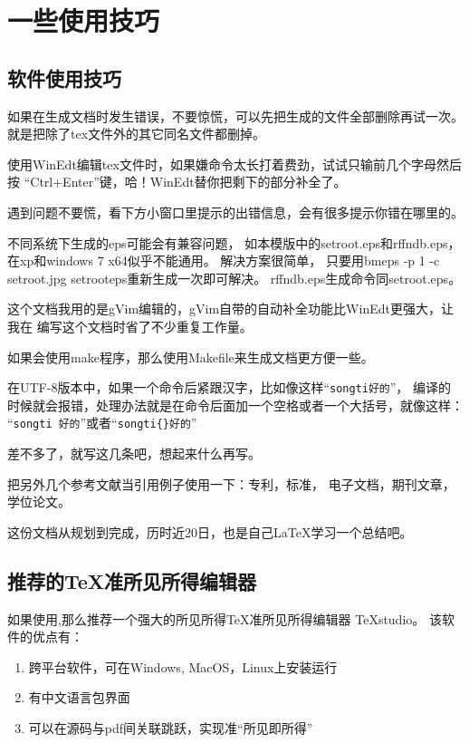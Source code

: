 \chapter{一些使用技巧}



\section{软件使用技巧}

如果在生成文档时发生错误，不要惊慌，可以先把生成的文件全部删除再试一次。
就是把除了tex文件外的其它同名文件都删掉。

使用WinEdt编辑tex文件时，如果嫌命令太长打着费劲，试试只输前几个字母然后按
“Ctrl+Enter”键，哈！WinEdt替你把剩下的部分补全了。

遇到问题不要慌，看下方小窗口里提示的出错信息，会有很多提示你错在哪里的。

不同系统下生成的eps可能会有兼容问题，
如本模版中的setroot.eps和rffndb.eps，在xp和windows 7 x64似乎不能通用。
解决方案很简单，
只要用bmeps -p 1 -c setroot.jpg setrooteps重新生成一次即可解决。
rffndb.eps生成命令同setroot.eps。

这个文档我用的是gVim编辑的，gVim自带的自动补全功能比WinEdt更强大，让我在
编写这个文档时省了不少重复工作量。

如果会使用make程序，那么使用Makefile来生成文档更方便一些。

在UTF-8版本中，如果一个命令后紧跟汉字，比如像这样“\verb+songti好的+”，
编译的时候就会报错，处理办法就是在命令后面加一个空格或者一个大括号，就像这样：
“\verb+songti 好的+”或者“\verb+songti{}好的+”

差不多了，就写这几条吧，想起来什么再写。

把另外几个参考文献当引用例子使用一下：专利\cite{WangZL}，标准\cite{WangStd}，
电子文档\cite{ZLB:1997}，期刊文章\cite{LUOZ:2007}，
学位论文\cite{wang:2008,wangmt:2008}。

这份文档从规划到完成，历时近20日，也是自己\LaTeX 学习一个总结吧。

\section{推荐的\TeX 准所见所得编辑器}

如果使用\XeTeX ,那么推荐一个强大的所见所得\TeX 准所见所得编辑器 TeXstudio。
该软件的优点有：

\begin{enumerate}
	
	\item{跨平台软件，可在Windows, MacOS，Linux上安装运行}
	
	\item{有中文语言包界面} 
	
	\item{可以在源码与pdf间关联跳跃，实现准“所见即所得”} 
	
\end{enumerate}

